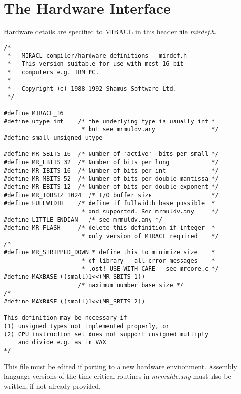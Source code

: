 \chapter{The Hardware Interface}
\pagebreak

Hardware details are specified to MIRACL in this header file {\em mirdef.h}.

\begin{verbatim}
/* 
 *   MIRACL compiler/hardware definitions - mirdef.h
 *   This version suitable for use with most 16-bit 
 *   computers e.g. IBM PC.
 *
 *   Copyright (c) 1988-1992 Shamus Software Ltd.
 */

#define MIRACL_16
#define utype int    /* the underlying type is usually int *
                      * but see mrmuldv.any                */
#define small unsigned utype

#define MR_SBITS 16  /* Number of 'active'  bits per small */
#define MR_LBITS 32  /* Number of bits per long            */
#define MR_IBITS 16  /* Number of bits per int             */
#define MR_MBITS 52  /* Number of bits per double mantissa */
#define MR_EBITS 12  /* Number of bits per double exponent */
#define MR_IOBSIZ 1024  /* I/O buffer size                 */
#define FULLWIDTH    /* define if fullwidth base possible  *
                      * and supported. See mrmuldv.any     */
#define LITTLE_ENDIAN   /* see mrmuldv.any */
#define MR_FLASH     /* delete this definition if integer  *
                      * only version of MIRACL required    */
/* 
#define MR_STRIPPED_DOWN * define this to minimize size    *
                      * of library - all error messages    *
                      * lost! USE WITH CARE - see mrcore.c */
#define MAXBASE ((small)1<<(MR_SBITS-1))
                     /* maximum number base size */
/* 
#define MAXBASE ((small)1<<(MR_SBITS-2))

This definition may be necessary if 
(1) unsigned types not implemented properly, or
(2) CPU instruction set does not support unsigned multiply 
    and divide e.g. as in VAX
*/

\end{verbatim}

This file must be edited if porting to a new hardware environment. Assembly 
language versions of the time-critical routines in {\em mrmuldv.any} 
must also be written, if not already provided.





